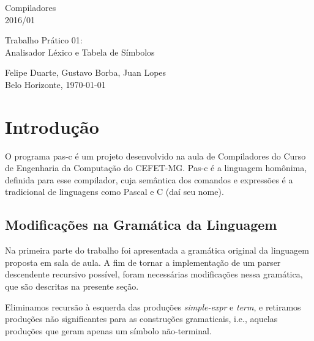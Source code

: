 \documentclass[11pt]{article}
\begin{document}
\thispagestyle{empty}

\begin{center}
\begin{minipage}[l]{10cm}{
\center
Compiladores \\
2016/01 \\
}\end{minipage}
 \vfill
 \begin{minipage}[l]{11cm}{
   \begin{center}
   \Large{Trabalho Prático 01: \\ Analisador Léxico e Tabela de Símbolos}
   \end{center}
}\end{minipage}
\end{center}
 \vspace*{8cm}
 \begin{center}
 \begin{minipage}[l]{10cm}{
 \center Felipe Duarte, Gustavo  Borba, Juan Lopes\\
 Belo Horizonte, \today \\
 }
 \end{minipage}
 \end{center}

\newpage
\thispagestyle{empty}
\tableofcontents

\newpage
\clearpage
\setcounter{page}{1}

\section{Introdução}
	O programa pas-c é um projeto desenvolvido na aula de Compiladores do Curso de Engenharia da Computação do CEFET-MG. 
	Pas-c é a linguagem homônima, definida para esse compilador, cuja semântica dos comandos e expressões é a tradicional 
	de linguagens como Pascal e C (daí seu nome).
	
	\subsection{Modificações na Gramática da Linguagem}
	\label{gramatica}

		Na primeira parte do trabalho foi apresentada a gramática original da linguagem proposta em sala de aula.
		A fim de tornar a implementação de um parser descendente recursivo possível, 
		foram necessárias modificações nessa gramática, que são descritas na presente seção.
	
		Eliminamos recursão à esquerda das produções \textit{simple-expr} e \textit{term}, e retiramos produções
		não significantes para as construções gramaticais, i.e., aquelas produções que geram apenas um 
		símbolo não-terminal.
		
\end{document}
